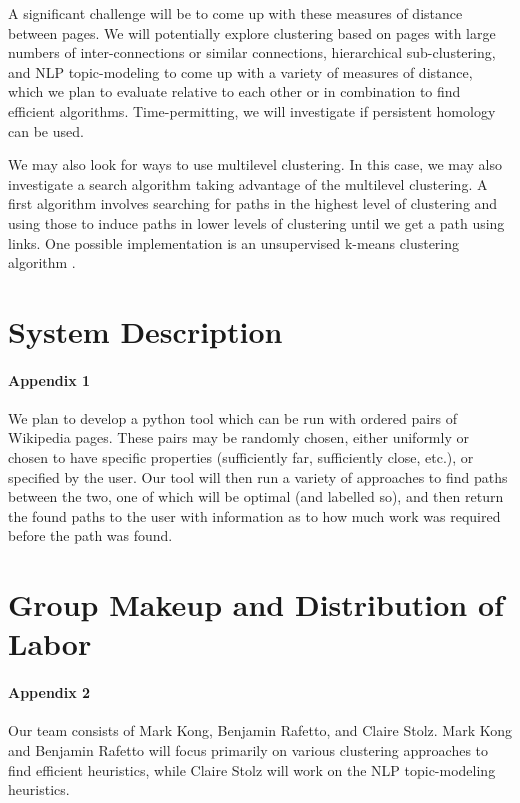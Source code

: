 \documentclass[11pt]{article}
\begin{document}
A significant challenge will be to come up with these measures of distance between pages. We will potentially explore clustering based on pages with large numbers of inter-connections or similar connections, hierarchical sub-clustering, and NLP topic-modeling to come up with a variety of measures of distance, which we plan to evaluate relative to each other or in combination to find efficient algorithms.  Time-permitting, we will investigate if persistent homology can be used.

We may also look for ways to use multilevel clustering.  In this case, we may also investigate a search algorithm taking advantage of the multilevel clustering.  A first algorithm involves searching for paths in the highest level of clustering and using those to induce paths in lower levels of clustering until we get a path using links. One possible implementation is an unsupervised k-means clustering algorithm \cite{kmeans}.  

\appendix

\section{System Description}

 \paragraph{Appendix 1} We plan to develop a python tool which can be run with ordered pairs of Wikipedia pages. These pairs may be randomly chosen, either uniformly or chosen to have specific properties (sufficiently far, sufficiently close, etc.), or specified by the user. Our tool will then run a variety of approaches to find paths between the two, one of which will be optimal (and labelled so), and then return the found paths to the user with information as to how much work was required before the path was found.
 
\section{Group Makeup and Distribution of Labor}

 \paragraph{Appendix 2} Our team consists of Mark Kong, Benjamin Rafetto, and Claire Stolz. Mark Kong and Benjamin Rafetto will focus primarily on various clustering approaches to find efficient heuristics, while Claire Stolz will work on the NLP topic-modeling heuristics.
 

\end{document}
